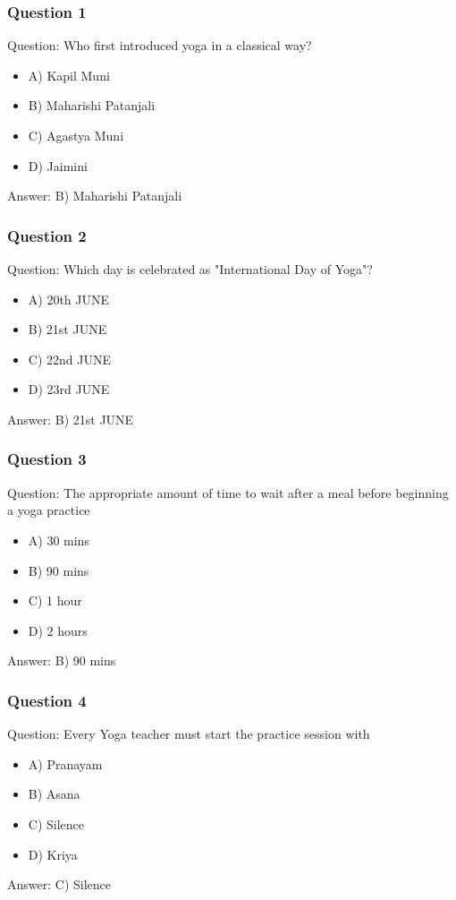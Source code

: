 \begin{frame}[fragile]\frametitle{Question 1}
Question: Who first introduced yoga in a classical way?
\begin{itemize}
\item A) Kapil Muni
\item B) Maharishi Patanjali
\item C) Agastya Muni
\item D) Jaimini
\end{itemize}
Answer: B) Maharishi Patanjali
\end{frame}

\begin{frame}[fragile]\frametitle{Question 2}
Question: Which day is celebrated as "International Day of Yoga"?
\begin{itemize}
\item A) 20th JUNE
\item B) 21st JUNE
\item C) 22nd JUNE
\item D) 23rd JUNE
\end{itemize}
Answer: B) 21st JUNE
\end{frame}

\begin{frame}[fragile]\frametitle{Question 3}
Question: The appropriate amount of time to wait after a meal before beginning a yoga practice
\begin{itemize}
\item A) 30 mins
\item B) 90 mins
\item C) 1 hour
\item D) 2 hours
\end{itemize}
Answer: B) 90 mins
\end{frame}

\begin{frame}[fragile]\frametitle{Question 4}
Question: Every Yoga teacher must start the practice session with
\begin{itemize}
\item A) Pranayam
\item B) Asana
\item C) Silence
\item D) Kriya
\end{itemize}
Answer: C) Silence
\end{frame}

